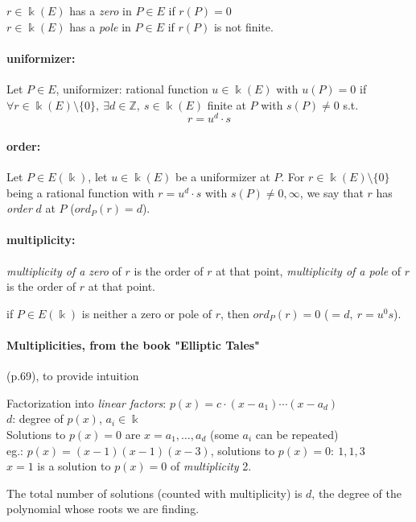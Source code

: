 \documentclass{article}
\theoremstyle{definition}
\begin{document}
$r \in \Bbbk(E)$ has a \emph{zero} in $P\in E$ if $r(P)=0$\\
$r \in \Bbbk(E)$ has a \emph{pole} in $P\in E$ if $r(P)$ is not finite.

\paragraph{uniformizer:} Let $P\in E$,
uniformizer: rational function $u \in \Bbbk(E)$ with $u(P)=0$ if
$\forall r\in \Bbbk(E) \setminus \{0\},~ \exists d \in \mathbb{Z},~ s\in \Bbbk(E)$ finite at $P$ with $s(P) \neq 0$ s.t.
$$r=u^d \cdot s$$

\paragraph{order:} Let $P \in E(\Bbbk)$, let $u \in \Bbbk(E)$ be a uniformizer at $P$.
For $r \in \Bbbk(E) \setminus \{0\}$ being a rational function with $r=u^d \cdot s$ with $s(P)\neq 0, \infty$, we say that $r$ has \emph{order} $d$ at $P$ ($ord_P(r)=d$).

\paragraph{multiplicity:} \emph{multiplicity of a zero} of $r$ is the order of $r$ at that point, \emph{multiplicity of a pole} of $r$ is the order of $r$ at that point.

if $P \in E(\Bbbk)$ is neither a zero or pole of $r$, then $ord_P(r)=0$ ($=d,~ r=u^0s$).

\vspace{0.5cm}
\begin{minipage}{4.3 in}
    \paragraph{Multiplicities, from the book "Elliptic Tales"} (p.69), to provide intuition

    Factorization into \emph{linear factors}: $p(x)=c\cdot (x-a_1) \cdots (x-a_d)$\\
    $d$: degree of $p(x)$, $a_i \in \Bbbk$\\
    Solutions to $p(x)=0$ are $x=a_1, \ldots, a_d$ (some $a_i$ can be repeated)\\
    eg.: $p(x)=(x-1)(x-1)(x-3)$, solutions to $p(x)=0:~ 1, 1, 3$\\
    $x=1$ is a solution to $p(x)=0$ of \emph{multiplicity} 2.

    The total number of solutions (counted with multiplicity) is $d$, the degree of the polynomial whose roots we are finding.
\end{minipage}
\end{document}
